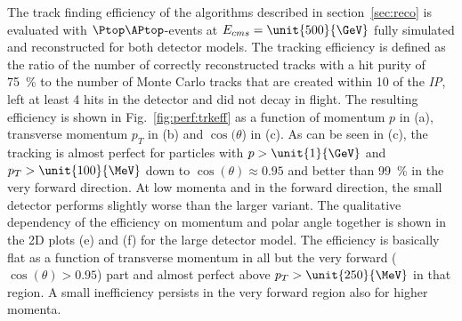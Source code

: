The track finding efficiency of the algorithms described in section~\ref{sec:reco} is evaluated with $\Ptop\APtop$-events
at $E_{cms}=\unit{500}{\GeV}$ fully simulated and reconstructed for both detector models.
The tracking efficiency is defined as the ratio of the number of correctly reconstructed tracks with a hit purity of 75~\% to the
number of Monte Carlo tracks that are created within \unit{10}{\cm} of the {\em IP}, left at least 4 hits in the detector and
did not decay in flight. The resulting efficiency is shown in Fig.~\ref{fig:perf:trkeff} as a function of momentum $p$ in (a),
transverse momentum $p_T$ in (b) and $\cos(\theta$) in (c). As can be seen in (c), the tracking is almost perfect for particles
with $p>\unit{1}{\GeV}$ and $p_T>\unit{100}{\MeV}$ down to $\cos(\theta) \approx 0.95$ and better than 99~\% in the very forward
direction. At low momenta and in the forward direction, the small detector performs slightly worse than the larger variant.
The qualitative dependency of the efficiency on momentum and polar angle together is shown in the 2D plots (e) and (f) for the large
detector model. The efficiency is basically flat as a function of transverse momentum in all but the very forward ($\cos(\theta)>0.95$)
part and almost perfect above $p_T>\unit{250}{\MeV}$ in that region. A small inefficiency persists in the very forward region
also for higher momenta.


